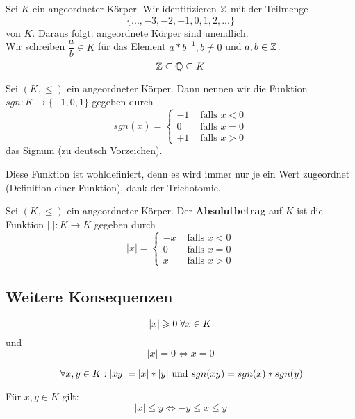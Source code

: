 \documentclass[main.tex]{subfiles}
\begin{document}
\begin{Bemerkung}
  Sei $K$ ein angeordneter Körper. Wir identifizieren $\mathbb{Z}$ mit der Teilmenge
  $$\{...,-3,-2,-1,0,1,2,...\}$$
  von $K$. Daraus folgt: angeordnete Körper sind unendlich.\\
  Wir schreiben $\dfrac{a}{b}\in K$ für das Element $a*b^{-1}, b\neq 0$ und $a,b \in \mathbb{Z}$.
  $$ \mathbb{Z} \subseteq \mathbb{Q} \subseteq K$$
\end{Bemerkung}

\begin{Definition}[Signum]
  Sei $(K,\leq)$ ein angeordneter Körper. Dann nennen wir die Funktion $sgn: K \to \{-1,0,1\}$ gegeben durch
  $$sgn (x) = \left\{ \begin{aligned}
    -1 & \text{ falls } x < 0\\
    0 & \text{ falls } x = 0\\
    +1 & \text{ falls } x > 0
  \end{aligned}\right.$$
  das Signum (zu deutsch Vorzeichen).
\end{Definition}

\begin{Bemerkung}
  Diese Funktion ist wohldefiniert, denn es wird immer nur je ein Wert zugeordnet (Definition einer Funktion), dank der Trichotomie.
\end{Bemerkung}

\begin{Definition}[Absolutbetrag]
  Sei $(K,\leq)$ ein angeordneter Körper. Der \textbf{Absolutbetrag} auf $K$ ist die Funktion $|.| : K \to K$ gegeben durch
  $$|x| = \left\{ \begin{aligned}
    -x & \text{ falls } x < 0\\
    0 & \text{ falls } x = 0\\
    x & \text{ falls } x > 0
  \end{aligned}\right.$$
\end{Definition}

\subsection{Weitere Konsequenzen}

\begin{Theorem}
  $$|x| \geqslant 0 \;\forall x\in K$$
  und
  $$|x| = 0 \Leftrightarrow x = 0$$
\end{Theorem}
\begin{Theorem}
  $$\;\forall x,y \in K : |xy| = |x|*|y| \text{ und }sgn(xy) = sgn(x)*sgn(y)$$
\end{Theorem}
\begin{Theorem}
  Für $x,y \in K$ gilt:
  $$|x|\leq y \Leftrightarrow -y \leq x \leq y$$
\end{Theorem}
\end{document}
